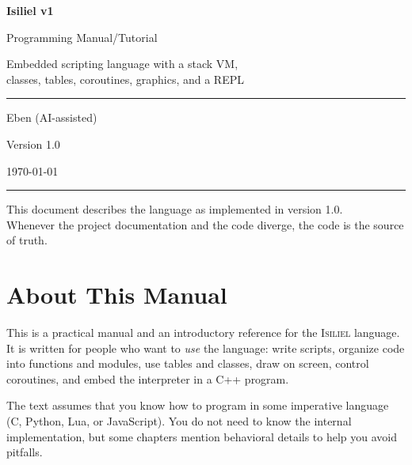 \documentclass[11pt,a4paper,oneside]{report}
\newcommand{\isiliel}{\textsc{Isiliel}}
\begin{document}
\hypersetup{pageanchor=false}
\begin{titlepage}
\centering
\vspace*{1.5cm}
{\Huge\bfseries\color{isilielblue} Isiliel v1\par}
\vspace{0.4cm}
{\LARGE Programming Manual/Tutorial\par}
\vspace{0.8cm}
{\large Embedded scripting language with a stack VM,\\
classes, tables, coroutines, graphics, and a REPL\par}
\vspace{2cm}
\rule{0.75\textwidth}{0.6pt}\par
\vspace{0.8cm}
{\large Eben (AI-assisted)\par}
{\large Version 1.0\par}
{\large \today\par}
\vspace{0.8cm}
\rule{0.75\textwidth}{0.6pt}\par
\vfill
{\small This document describes the language as implemented in version 1.0.\\
Whenever the project documentation and the code diverge, the code is the source of truth.}
\end{titlepage}
\hypersetup{pageanchor=true}

\tableofcontents
\clearpage

\chapter{About This Manual}
\label{cap:sobre}

This is a practical manual and an introductory reference for the
\isiliel{} language. It is written for people who want to \emph{use} the
language: write scripts, organize code into functions and modules, use
tables and classes, draw on screen, control coroutines, and embed the
interpreter in a C++ program.

The text assumes that you know how to program in some imperative language
(C, Python, Lua, or JavaScript). You do not need to know the internal
implementation, but some chapters mention behavioral details to help you
avoid pitfalls.
\end{document}
